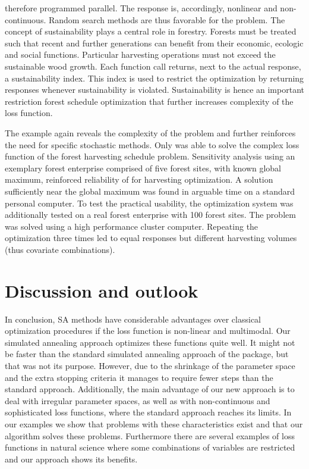 therefore programmed parallel. The response is, accordingly, nonlinear and non-continuous. Random search methods are thus favorable for the problem. The concept of sustainability plays a central role in forestry. Forests must be treated such that recent and further generations can benefit from their economic, ecologic and social functions. Particular harvesting operations must not exceed the sustainable wood growth. Each function call returns, next to the actual response, a sustainability index. This index is used to restrict the optimization by returning  responses whenever sustainability is violated. Sustainability is hence an important restriction forest schedule optimization that further increases complexity of the loss function.

The example again reveals the complexity of the problem and further reinforces the need for specific stochastic methods. Only  was able to solve the complex loss function of the forest harvesting schedule problem. Sensitivity analysis using an exemplary forest enterprise comprised of five forest sites, with known global maximum, reinforced reliability of  for harvesting optimization. A solution sufficiently near the global maximum was found in arguable time on a standard personal computer. To test the practical usability, the optimization system was additionally tested on a real forest enterprise with 100 forest sites. The problem was solved using a high performance cluster computer. Repeating the optimization three times led to equal responses but different harvesting volumes (thus covariate combinations).

\section{Discussion and outlook}
In conclusion, SA methods have considerable advantages over classical optimization procedures if the loss function is non-linear and multimodal. Our simulated annealing approach optimizes these functions quite well. It might not be faster than the standard simulated annealing approach of the  package, but that was not its purpose. However, due to the shrinkage of the parameter space and the extra stopping criteria it manages to require fewer steps than the standard approach. Additionally, the main advantage of our new approach is to deal with irregular parameter spaces, as well as with non-continuous and sophisticated loss functions, where the standard approach reaches its limits. In our examples we show that problems with these characteristics exist and that our algorithm solves these problems. Furthermore there are several examples of loss functions in natural science where some combinations of variables are restricted and our approach shows its benefits.

